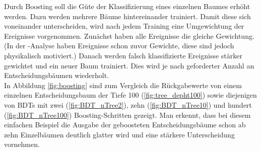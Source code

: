 Durch Boosting soll die G\"ute der Klassifizierung eines einzelnen Baumes erh\"oht werden. Dazu werden mehrere B\"aume hintereinander trainiert. Damit diese sich voneinander unterscheiden, wird nach jedem Training eine Umgewichtung der Ereignisse vorgenommen. Zun\"achst haben alle Ereignisse die gleiche Gewichtung. (In der \ttH-Analyse haben Ereignisse schon zuvor Gewichte, diese sind jedoch physikalisch motiviert.) Danach werden falsch klassifizierte Ereignisse st\"arker gewichtet und ein neuer Baum trainiert. Dies wird je nach geforderter Anzahl an Entscheidungsb\"aumen wiederholt.\\
In Abbildung \ref{fig:boosting} sind zum Vergleich die R\"uckgabewerte von einem einzelnen Entscheidungsbaum der Tiefe 100 (\ref{fig:tree_depht100}) sowie diejenigen von BDTs mit zwei (\ref{fig:BDT_nTree2}), zehn (\ref{fig:BDT_nTree10}) und hundert (\ref{fig:BDT_nTree100}) Boosting-Schritten gezeigt. Man erkennt, dass bei diesem einfachen Beispiel die Ausgabe der geboosteten Entscheidungsb\"aume schon ab zehn Einzelb\"aumen deutlich glatter wird und eine st\"arkere Unterscheidung vornehmen.

